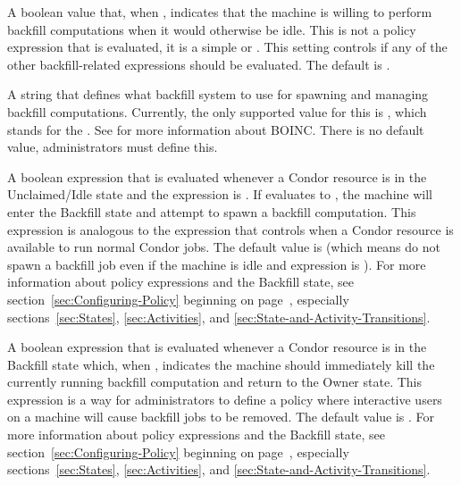 \begin{description}

\label{param:EnableBackfill}
\item[\Macro{ENABLE\_BACKFILL}]
  A boolean value that, when , indicates that the machine is willing
  to perform backfill computations when it would otherwise be idle.
  This is not a policy expression that is evaluated, it is a simple
   or .
  This setting controls if any of the other backfill-related
  expressions should be evaluated.
  The default is .

\label{param:BackfillSystem}
\item[\Macro{BACKFILL\_SYSTEM}]
  A string that defines what backfill system to use for spawning and managing
  backfill computations.
  Currently, the only supported value for this is , which
  stands for the .
  See  for more information about
  BOINC.
  There is no default value, administrators must define this.
  
\label{param:StartBackfill}
\item[\Macro{START\_BACKFILL}]
  A boolean expression that is evaluated whenever a Condor resource is in the
  Unclaimed/Idle state and the  expression
  is .  
  If  evaluates to , the machine
  will enter the Backfill state and attempt to spawn a backfill
  computation. 
  This expression is analogous to the  expression that
  controls when a Condor resource is available to run normal Condor
  jobs.
  The default value is  (which means do not spawn a
  backfill job even if the machine is idle and
   expression is ).
  For more information about policy expressions and the Backfill
  state, see section~\ref{sec:Configuring-Policy} beginning on
  page~\pageref{sec:Configuring-Policy}, especially
  sections~\ref{sec:States}, \ref{sec:Activities}, and
  \ref{sec:State-and-Activity-Transitions}.

\label{param:EvictBackfill}
\item[\Macro{EVICT\_BACKFILL}]
  A boolean expression that is evaluated whenever a Condor resource is in the
  Backfill state which, when , indicates the machine should
  immediately kill the currently running backfill computation and
  return to the Owner state.
  This expression is a way for administrators to define a policy where
  interactive users on a machine will cause backfill jobs to be
  removed.
  The default value is .
  For more information about policy expressions and the Backfill
  state, see section~\ref{sec:Configuring-Policy} beginning on
  page~\pageref{sec:Configuring-Policy}, especially
  sections~\ref{sec:States}, \ref{sec:Activities}, and
  \ref{sec:State-and-Activity-Transitions}.

\end{description}


